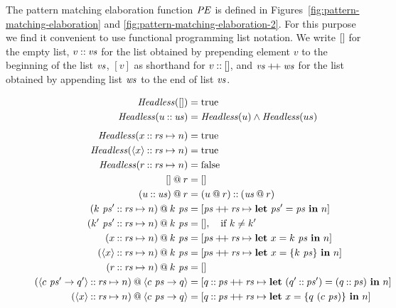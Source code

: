 \documentclass[11pt]{article}
\newcommand{\key}[1]{\textbf{#1}} %
\newcommand{\handleSymbol}{\rightarrow}
\newcommand{\handle}[2]{{#1} \handleSymbol {#2}}
\newcommand{\thunk}[1]{\{{#1}\}}
\newcommand{\effin}[1]{\langle {#1} \rangle}
\begin{document}
The pattern matching elaboration function $\mathit{PE}$ is defined in
Figures~\ref{fig:pattern-matching-elaboration} and \ref{fig:pattern-matching-elaboration-2}. For this purpose we
find it convenient to use functional programming list notation. We
write $[]$ for the empty list, $v \mathbin{::} \mathit{vs}$ for the list
obtained by prepending element $v$ to the beginning of the list $\mathit{vs}$,
$[v]$ as shorthand for $v \mathbin{::} []$, and $\mathit{vs} \mathbin{+\!+} \mathit{ws}$ for
the list obtained by appending list $\mathit{ws}$ to the end of list $\mathit{vs}$.
%
\begin{figure*}
\small
\begin{align*}
\hdless(\emptylist) &= \true\\
  \hdless(u \cons \us) &= \hdless(u) \wedge \hdless(us)\\[1ex]
  \hdless(x \cons \rs \mapsto n) &= \true\\
  \hdless(\effin{x} \cons \rs \mapsto n) &= \true\\
  \hdless(r \cons \rs \mapsto n) &= \false\\
   \emptylist \proj r &= \emptylist \\
(u \cons \us) \proj r &= (u \proj r) \cons (\us \proj r) \\
(k~\ps' \cons \rs \mapsto n) \proj k~\ps &=
        [\ps \concat \rs \mapsto \key{let}~\ps' = \ps~\key{in}~n] \\
(k'~\ps' \cons \rs \mapsto n) \proj k~\ps &= [], \quad \text{if }k \neq k'\\
    (x \cons \rs \mapsto n) \proj k~\ps &=
        [\ps \concat \rs \mapsto \key{let}~x = k~\ps~\key{in}~n] \\
(\effin{x} \cons \rs \mapsto n) \proj k~\ps &= [ps \concat \rs \mapsto
          \key{let}~x = \thunk{k~\ps}~\key{in}~n]\\
     (r \cons \rs \mapsto n) \proj k~\ps &= \emptylist\\
%
%
(\effin{\handle{c~\ps'}{q'}} \cons \rs \mapsto n) \proj \effin{\handle{c~\ps}{q}} &=
  [q \cons \ps \concat \rs \mapsto \key{let}~(q' \cons \ps') = (q \cons \ps)~\key{in}~n] \\
(\effin{x} \cons \rs \mapsto n) \proj \effin{\handle{c~\ps}{q}} &=
  [q \cons \ps \concat \rs \mapsto \key{let}~x = \thunk{q~(c~\ps)}~\key{in}~n] \\

\end{align*}
\end{figure*}
\end{document}
